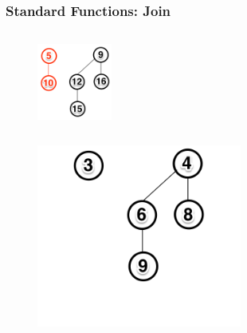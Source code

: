 \documentclass[13pt]{beamer}
\begin{document}
\begin{frame}
\frametitle{Standard Functions: Join}
  \begin{columns}[T] %
    \begin{column}[T]{8cm} %
       \begin{figure}
        \includegraphics[height=2.5cm]{./img/joinnew2.png}
      \end{figure}
    \end{column}
    \begin{column}[T]{6cm} %
       
    \end{column}
  \end{columns}

  \begin{figure}
    \includegraphics[height=6cm]{./img/joinorig.png}
  \end{figure}

\end{frame}
\end{document}

